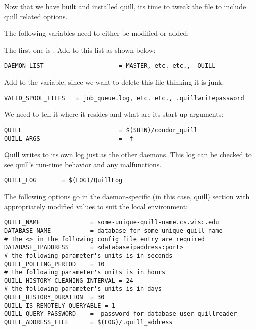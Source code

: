 \begin{enumerate}
Now that we have built and installed quill, its time to tweak the 
 file to include quill related options.

The following variables need to either be modified or added:

The first one is .  Add  to this
list as shown below:

\begin{verbatim}
DAEMON_LIST                     = MASTER, etc. etc.,  QUILL
\end{verbatim}

Add  to the 
variable, since we  want  to delete this file
thinking it is junk:

\begin{verbatim}
VALID_SPOOL_FILES	= job_queue.log, etc. etc., .quillwritepassword
\end{verbatim}

We need to tell it where it resides and what are its start-up arguments:
\begin{verbatim}
QUILL                           = $(SBIN)/condor_quill
QUILL_ARGS                      = -f
\end{verbatim}

Quill writes to its own log just as the other daemons.  This log can be 
checked to see quill's run-time behavior and any malfunctions.
\begin{verbatim}
QUILL_LOG       = $(LOG)/QuillLog
\end{verbatim}

The following options go in the daemon-specific (in this case, quill) 
section with appropriately modified values to suit the local environment:

\begin{verbatim}
QUILL_NAME              = some-unique-quill-name.cs.wisc.edu
DATABASE_NAME           = database-for-some-unique-quill-name
# The <> in the following config file entry are required
DATABASE_IPADDRESS      = <databaseipaddress:port>
# the following parameter's units is in seconds
QUILL_POLLING_PERIOD    = 10
# the following parameter's units is in hours
QUILL_HISTORY_CLEANING_INTERVAL = 24
# the following parameter's units is in days
QUILL_HISTORY_DURATION 	= 30
QUILL_IS_REMOTELY_QUERYABLE = 1
QUILL_QUERY_PASSWORD 	=  password-for-database-user-quillreader
QUILL_ADDRESS_FILE      = $(LOG)/.quill_address
\end{verbatim}


\end{enumerate}

